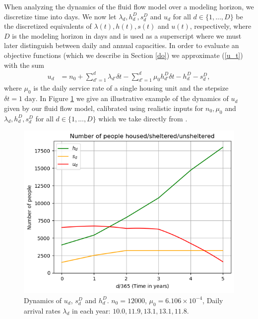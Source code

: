 \documentclass[12pt,a4paper]{article}
\begin{document}
When analyzing the dynamics of the fluid flow model over a modeling horizon, we discretize time into days. We now let $\lambda_d, h^D_d, s^D_d$ and $u_d$ for all $d \in \{1,...,D\}$ be the discretized equivalents of $\lambda(t), h(t), s(t)$ and $u(t)$, respectively, where $D$ is the modeling horizon in days and is used as a superscript where we must later distinguish between daily and annual capacities. In order to evaluate an objective functions (which we describe in Section \ref{do}) we approximate (\ref{u_t}) with the sum 
%
\begin{align} \label{u_t_discrete}
u_d & = n_0 + \sum_{d'=1}^{d} \lambda_{d'} \delta t - \sum_{d'=1}^{d} \mu_0 h^D_{d'} \delta t - h^D_d - s^D_d, 
\end{align}
%
where $\mu_0$ is the daily service rate of a single housing unit and the stepsize $\delta t = 1 \text{ day}$. In Figure \ref{fig:ut-illustrative} we give an illustrative example of the dynamics of $u_d$ given by our fluid flow model, calibrated using realistic inputs for $n_0, \mu_0$ and $\lambda_d, h^D_d, s^D_d$ for all $d \in \{1,...,D\}$ which we take directly from \cite{singham2023discrete}. 
%
\begin{figure}[h!]%
    \centering
    \includegraphics[scale=0.8]{u_t_example.png}
    \caption{Dynamics of $u_d$, $s^D_d$ and $h^D_d$. $n_0 = 12000$, $\mu_0 = 6.106 \times 10^{-4}$, Daily arrival rates $\lambda_d$ in each year: $10.0,11.9,13.1,13.1,11.8$.}
    \label{fig:ut-illustrative}
\end{figure}
%
\end{document}
